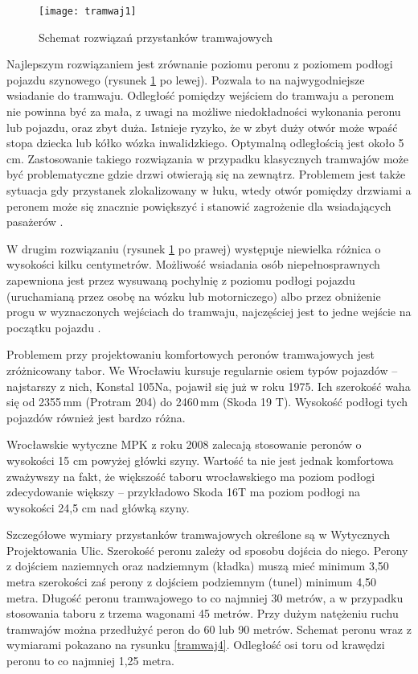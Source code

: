 \documentclass[twoside,12pt]{article}
\begin{document}
		\begin{figure}[H]
		\centering
		\texttt{[image: tramwaj1]}\\
		\caption{Schemat rozwiązań przystanków tramwajowych}
		\label{tramwaj1}
	\end{figure}
	
	Najlepszym rozwiązaniem jest zrównanie poziomu peronu z poziomem podłogi pojazdu szynowego (rysunek \ref{tramwaj1} po lewej). Pozwala to na najwygodniejsze wsiadanie do tramwaju. Odległość pomiędzy wejściem do tramwaju a peronem nie powinna być za mała, z uwagi na możliwe niedokładności wykonania peronu lub pojazdu, oraz zbyt duża. Istnieje ryzyko, że w zbyt duży otwór może wpaść stopa dziecka lub kółko wózka inwalidzkiego. Optymalną odległością jest około 5 cm. Zastosowanie takiego rozwiązania w przypadku klasycznych tramwajów może być problematyczne gdzie drzwi otwierają się na zewnątrz. Problemem jest także sytuacja gdy przystanek zlokalizowany w łuku, wtedy otwór pomiędzy drzwiami a peronem może się znacznie powiększyć i stanowić zagrożenie dla wsiadających pasażerów \cite{makuch2}.
	
	W drugim rozwiązaniu (rysunek \ref{tramwaj1} po prawej) występuje niewielka różnica o wysokości kilku centymetrów. Możliwość wsiadania osób niepełnosprawnych zapewniona jest przez wysuwaną pochylnię z poziomu podłogi pojazdu (uruchamianą przez osobę na wózku lub motorniczego) albo przez obniżenie progu w wyznaczonych wejściach do tramwaju, najczęściej jest to jedne wejście na początku pojazdu \cite{makuch2}.
	
	Problemem przy projektowaniu komfortowych peronów tramwajowych jest zróżnicowany tabor. We Wrocławiu kursuje regularnie osiem typów pojazdów -- najstarszy z nich, Konstal 105Na, pojawił się już w roku 1975. Ich szerokość waha się od 2355\,mm (Protram 204) do 2460\,mm (Skoda 19 T). Wysokość podłogi tych pojazdów również jest bardzo różna. 
	
	Wrocławskie wytyczne MPK z roku 2008 zalecają stosowanie peronów o wysokości 15 cm powyżej główki szyny. Wartość ta nie jest jednak komfortowa zważywszy na fakt, że większość taboru wrocławskiego ma poziom podłogi zdecydowanie większy -- przykładowo Skoda 16T ma poziom podłogi na wysokości 24,5 cm nad główką szyny. 
	
	Szczegółowe wymiary przystanków tramwajowych określone są w Wytycznych Projektowania Ulic. Szerokość peronu zależy od sposobu dojścia do niego. Perony z dojściem naziemnych oraz nadziemnym (kładka) muszą mieć minimum 3,50 metra szerokości zaś perony z dojściem podziemnym (tunel) minimum 4,50 metra. Długość peronu tramwajowego to co najmniej 30 metrów, a w przypadku stosowania taboru z trzema wagonami 45 metrów. Przy dużym natężeniu ruchu tramwajów można przedłużyć peron do 60 lub 90 metrów. Schemat peronu wraz z wymiarami pokazano na rysunku \ref{tramwaj4}. Odległość osi toru od krawędzi peronu to co najmniej 1,25 metra. 
	
\end{document}
